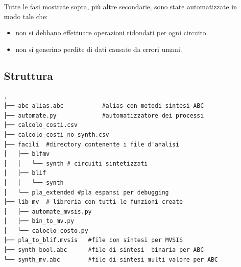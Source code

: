 \documentclass[
]{book}
\providecommand{\tightlist}{%
  \setlength{\itemsep}{0pt}\setlength{\parskip}{0pt}}
\begin{document}
Tutte le fasi mostrate sopra, più altre secondarie, sono state automatizzate in modo tale che:

\begin{itemize}
\tightlist
\item
  non si debbano effettuare operazioni ridondati per ogni circuito
\item
  non si generino perdite di dati causate da errori umani.
\end{itemize}

\hypertarget{struttura}{%
\subsection{Struttura}\label{struttura}}

\begin{verbatim}
.
├── abc_alias.abc           #alias con metodi sintesi ABC
├── automate.py             #automatizzatore dei processi
├── calcolo_costi.csv
├── calcolo_costi_no_synth.csv
├── facili  #directory contenente i file d'analisi
│   ├── blfmv
│   │   └── synth # circuiti sintetizzati
│   ├── blif
│   │   └── synth
│   └── pla_extended #pla espansi per debugging
├── lib_mv  # libreria con tutti le funzioni create
│   ├── automate_mvsis.py
│   ├── bin_to_mv.py
│   └── caloclo_costo.py
├── pla_to_blif.mvsis   #file con sintesi per MVSIS
├── synth_bool.abc      #file di sintesi  binaria per ABC
└── synth_mv.abc        #file di sintesi multi valore per ABC
\end{verbatim}

\newpage
\end{document}
